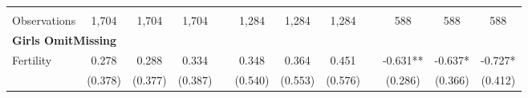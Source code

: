 \begin{landscape}
\begin{table}[htpb!]
\begin{center}
\begin{tabular}{lcccp{2mm}cccp{2mm}ccc}
\begin{footnotesize}\end{footnotesize}&\begin{footnotesize}\end{footnotesize}&\begin{footnotesize}\end{footnotesize}&\begin{footnotesize}\end{footnotesize}&\begin{footnotesize}\end{footnotesize}&\begin{footnotesize}\end{footnotesize}&\begin{footnotesize}\end{footnotesize}&\begin{footnotesize}\end{footnotesize}&\begin{footnotesize}\end{footnotesize}&\begin{footnotesize}\end{footnotesize}&\begin{footnotesize}\end{footnotesize}&\begin{footnotesize}\end{footnotesize}\\Observations&1,704&1,704&1,704&&1,284&1,284&1,284&&588&588&588\\
\multicolumn{12}{l}{\textbf{Girls OmitMissing}}\\ 
Fertility&0.278&0.288&0.334&&0.348&0.364&0.451&&-0.631**&-0.637*&-0.727*\\
&(0.378)&(0.377)&(0.387)&&(0.540)&(0.553)&(0.576)&&(0.286)&(0.366)&(0.412)\\

\end{tabular}
\end{center}
\end{table}
\end{landscape}
